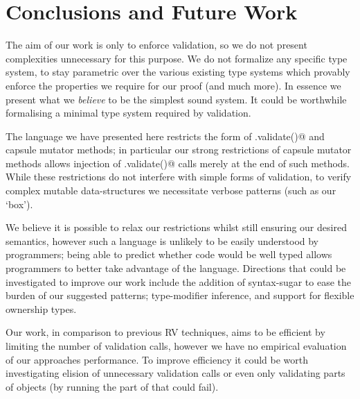 \section{Conclusions and Future Work}
The aim of our work is only to enforce validation, so we do not present complexities unnecessary for this purpose. We do not formalize any specific type system, to stay parametric over 
the various existing type systems which provably enforce the properties we require for our proof (and much more).
In essence we present what we \emph{believe} to be the simplest sound system.
It could be worthwhile formalising a minimal type system required by validation.






The language we have presented here restricts the form of \Q@.validate()@
and capsule mutator methods; in particular
our strong restrictions of capsule mutator methods
allows injection of \Q@.validate()@ calls merely at the end of such methods.
While these restrictions do not interfere with simple
forms of validation, to verify complex mutable data-structures we necessitate verbose patterns (such as our `box').

We believe it is possible to relax our restrictions whilst
still ensuring our desired semantics, however such a language is unlikely to be easily understood by programmers;
being able to predict whether code would be well typed allows programmers
to better take advantage of the language.
Directions that could be investigated to improve our work include the addition of syntax-sugar to ease the burden of our suggested patterns; type-modifier inference, and support for flexible ownership types.

Our work, in comparison to previous RV techniques, aims to be efficient by limiting the number of validation calls, however we have no empirical evaluation of our approaches performance.
To improve efficiency it could be worth investigating elision of unnecessary validation calls
or even only validating parts of objects (by running the part of \Q@validate@ that could fail).